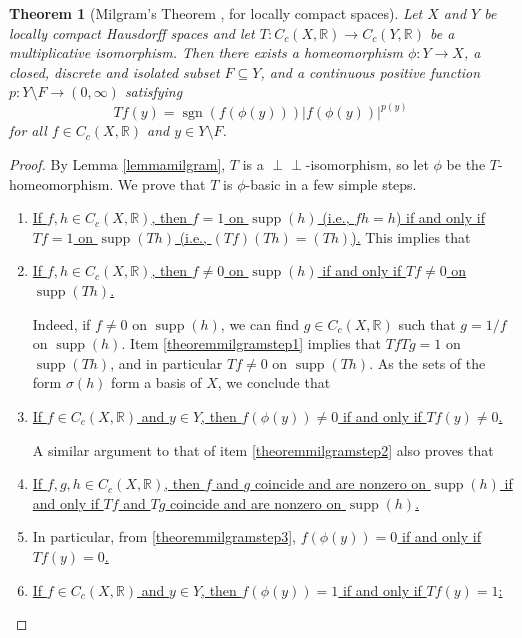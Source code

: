 \documentclass[letter,11pt]{amsart}
\theoremstyle{plain}		\newtheorem{theorem}[generalnumbering]{Theorem}
\theoremstyle{plain}		\newtheorem{corollary}[generalnumbering]{Corollary}
\theoremstyle{definition}		\newtheorem{definition}[generalnumbering]{Definition}
\theoremstyle{definition}		\newtheorem{example}[generalnumbering]{Example}
\theoremstyle{plain}		\newtheorem{proposition}[generalnumbering]{Proposition}
\theoremstyle{plain}		\newtheorem{lemma}[generalnumbering]{Lemma}
\theoremstyle{definition}
\newcommand{\perpp}{\perp\!\!\!\perp}
\DeclareMathOperator{\supp}{supp}
\begin{document}
\begin{theorem}[{Milgram's Theorem \cite[Theorem A]{MR0029476}, for locally compact spaces}]\label{theoremmilgram}
	Let $X$ and $Y$ be locally compact Hausdorff spaces and let $T\colon C_c(X,\mathbb{R})\to C_c(Y,\mathbb{R})$ be a multiplicative isomorphism. Then there exists a homeomorphism $\phi\colon Y\to X$, a closed, discrete and isolated subset $F\subseteq Y$, and a continuous positive function $p\colon Y\setminus F\to(0,\infty)$ satisfying
	\[Tf(y)=\operatorname{sgn}(f(\phi(y)))|f(\phi (y))|^{p(y)}\]
	for all $f\in C_c(X,\mathbb{R})$ and $y\in Y\setminus F$.
\end{theorem}
\begin{proof}
	By Lemma \ref{lemmamilgram}, $T$ is a $\perpp$-isomorphism, so let $\phi$ be the $T$-homeomorphism. We prove that $T$ is $\phi$-basic in a few simple steps.
	\begin{enumerate}[label=\arabic*.]
		\item\label{theoremmilgramstep1} \uline{If $f,h\in C_c(X,\mathbb{R})$, then $f=1$ on $\supp(h)$ (i.e., $fh=h$) if and only if $Tf=1$ on $\supp(Th)$ (i.e., $(Tf)(Th)=(Th)$).} This implies that
		
		\item\label{theoremmilgramstep2} \uline{If $f,h\in C_c(X,\mathbb{R})$, then $f\neq 0$ on $\supp(h)$ if and only if $Tf\neq 0$ on $\supp(Th)$.}
		
		Indeed, if $f\neq 0$ on $\supp(h)$, we can find $g\in C_c(X,\mathbb{R})$ such that $g=1/f$ on $\supp(h)$. Item \ref{theoremmilgramstep1} implies that $TfTg=1$ on $\supp(Th)$, and in particular $Tf\neq 0$ on $\supp(Th)$. As the sets of the form $\sigma(h)$ form a basis of $X$, we conclude that
		
		\item\label{theoremmilgramstep3} \uline{If $f\in C_c(X,\mathbb{R})$ and $y\in Y$, then $f(\phi(y))\neq 0$ if and only if $Tf(y)\neq 0$.}
		
		A similar argument to that of item \ref{theoremmilgramstep2} also proves that
		
		\item\label{theoremmilgramstep4} \uline{If $f,g,h\in C_c(X,\mathbb{R})$, then $f$ and $g$ coincide and are nonzero on $\supp(h)$ if and only if $Tf$ and $Tg$ coincide and are nonzero on $\supp(h)$.}
		
		\item\label{theoremmilgramstep5} In particular, from \ref{theoremmilgramstep3}, \uline{$f(\phi(y))=0$ if and only if $Tf(y)=0$.}
		\item\label{theoremmilgramstep6} \uline{If $f\in C_c(X,\mathbb{R})$ and $y\in Y$, then $f(\phi(y))=1$ if and only if $Tf(y)=1$:}
		

\end{enumerate}
\end{proof}
\end{document}
